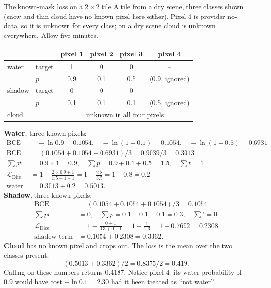 \begin{worked}[label={we:seghead:knownmask}]{The known-mask loss on a $2 \times 2$ tile}
A tile from a dry scene, three classes shown (snow and thin cloud have no known pixel here either). Pixel 4 is provider no-data, so it is
unknown for every class; on a dry scene cloud is unknown everywhere. Allow five minutes.
\begin{center}
\begin{tabular}{llcccc}
\toprule
& & pixel 1 & pixel 2 & pixel 3 & pixel 4\\
\midrule
water & target & 1 & 0 & 0 & --\\
      & $p$ & 0.9 & 0.1 & 0.5 & (0.9, ignored)\\
shadow & target & 0 & 0 & 0 & --\\
      & $p$ & 0.1 & 0.1 & 0.1 & (0.5, ignored)\\
cloud & & \multicolumn{4}{c}{unknown in all four pixels}\\
\bottomrule
\end{tabular}
\end{center}
\textbf{Water}, three known pixels:
\begin{align*}
  \text{BCE terms:}&\quad -\ln 0.9 = 0.1054,\quad -\ln(1 - 0.1) = 0.1054,\quad -\ln(1 - 0.5) = 0.6931\\
  \mathrm{BCE} &= (0.1054 + 0.1054 + 0.6931)/3 = 0.9039 / 3 = 0.3013\\
  \textstyle\sum pt &= 0.9 \times 1 = 0.9, \quad \sum p = 0.9 + 0.1 + 0.5 = 1.5, \quad \sum t = 1\\
  \mathcal{L}_{\text{Dice}} &= 1 - \frac{2 \times 0.9 + 1}{1.5 + 1 + 1} = 1 - \frac{2.8}{3.5} = 1 - 0.8 = 0.2\\
  \text{water term} &= 0.3013 + 0.2 = 0.5013.
\end{align*}
\textbf{Shadow}, three known pixels:
\begin{align*}
  \mathrm{BCE} &= (0.1054 + 0.1054 + 0.1054)/3 = 0.1054\\
  \textstyle\sum pt &= 0, \quad \sum p = 0.1 + 0.1 + 0.1 = 0.3, \quad \sum t = 0\\
  \mathcal{L}_{\text{Dice}} &= 1 - \frac{0 + 1}{0.3 + 0 + 1} = 1 - \frac{1}{1.3} = 1 - 0.7692 = 0.2308\\
  \text{shadow term} &= 0.1054 + 0.2308 = 0.3362.
\end{align*}
\textbf{Cloud} has no known pixel and drops out. The loss is the mean over the two classes present:
\[
  (0.5013 + 0.3362)/2 = 0.8375 / 2 = 0.419.
\]
Calling  on these numbers returns 0.4187.\tbrk{} Notice pixel 4: its
water probability of 0.9 would have cost $-\ln 0.1 = 2.30$ had it been treated as ``not water''.
\end{worked}


